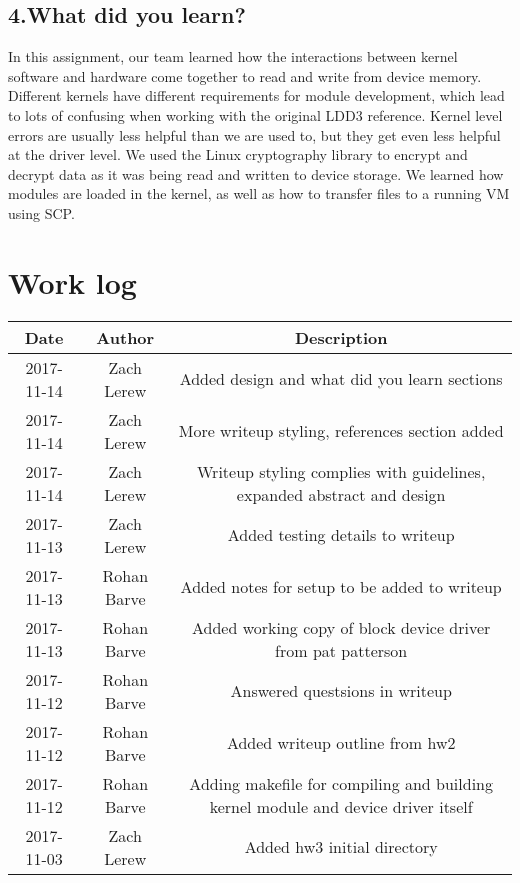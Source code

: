 \documentclass[onecolumn, draftclsnofoot,10pt, compsoc]{IEEEtran}
\begin{document}
	\subsection*{4.What did you learn?}
  In this assignment, our team learned how the interactions between kernel software and hardware come together to read and write from device memory.
  Different kernels have different requirements for module development, which lead to lots of confusing when working with the original LDD3 reference.
  Kernel level errors are usually less helpful than we are used to, but they get even less helpful at the driver level.
  We used the Linux cryptography library to encrypt and decrypt data as it was being read and written to device storage.
  We learned how modules are loaded in the kernel, as well as how to transfer files to a running VM using SCP.


	\section*{Work log}
  	\begin{center}
    	\begin{tabular}{ |c|c|c| }
    		\hline
    		Date & Author & Description \\
    		\hline
        2017-11-14 & Zach Lerew & Added design and what did you learn sections \\
        2017-11-14 & Zach Lerew & More writeup styling, references section added \\
        2017-11-14 & Zach Lerew & Writeup styling complies with guidelines, expanded abstract and design \\
        2017-11-13 & Zach Lerew & Added testing details to writeup \\
        2017-11-13 & Rohan Barve & Added notes for setup to be added to writeup \\
        2017-11-13 & Rohan Barve & Added working copy of block device driver from pat patterson \\
        2017-11-12 & Rohan Barve & Answered questsions in writeup \\
        2017-11-12 & Rohan Barve & Added writeup outline from hw2 \\
        2017-11-12 & Rohan Barve & Adding makefile for compiling and building kernel module and device driver itself \\
        2017-11-03 & Zach Lerew & Added hw3 initial directory \\
    		\hline
    	\end{tabular}
  	\end{center}


  
  
\end{document}
